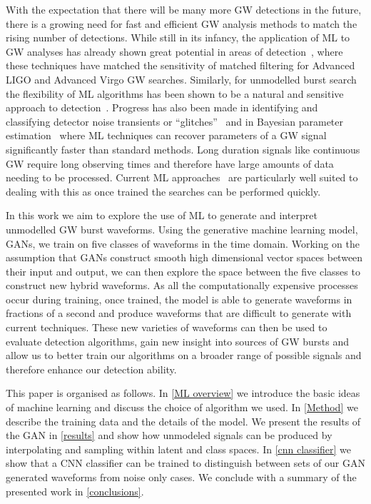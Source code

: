 \documentclass[12pt]{iopart}
\begin{document}
%
With the expectation that there will be many more GW detections in the
future, there is a growing need for fast and efficient GW analysis methods
to match the rising number of detections. While still in its infancy, the application of \ac{ML} to GW analyses has already shown great potential in areas of detection~\cite{Gabbard2017,Gebhard_2019,Krastev_2020}, where these techniques have matched the sensitivity of matched filtering for Advanced LIGO and Advanced Virgo GW searches. Similarly, for unmodelled burst search the flexibility of \ac{ML} algorithms has been shown to be a natural and sensitive approach to detection~\cite{2020arXiv200914611S}. Progress has also been made in identifying and classifying detector noise transients or  ``glitches''~\cite{Bahaadini, George_2018,Razzano_2018, 2020arXiv200801262G} and in Bayesian parameter estimation~\cite{gabbard2019bayesian,Chua:2019,green2020gravitationalwave} where \ac{ML} techniques can recover parameters of a GW signal significantly faster than standard methods. Long duration signals like continuous GW require long observing times and therefore have large amounts of data needing to be processed. Current \ac{ML} approaches~\cite{2020PhRvD.102b2005D, 2019PhRvD.100d4009D, 2020arXiv200708207B} are particularly well suited to dealing with this as once trained the searches can be performed quickly.

%
In this work we aim to explore the use of \ac{ML} to generate and interpret
unmodelled GW burst waveforms. Using the generative machine learning
model, \acp{GAN}, we train on five classes of waveforms in the time domain. Working on the assumption that \acp{GAN} construct smooth
 high dimensional vector spaces between their input and output, we can then
explore the space between the five classes to construct new
hybrid waveforms. As all the computationally expensive
processes occur during training, once trained, the model is able to
generate waveforms in fractions of a second and produce waveforms that are difficult to generate with current
techniques. These new varieties of waveforms can then be used to evaluate
detection algorithms, gain new insight into sources of GW
bursts and  allow us to better train our algorithms on a
broader range of possible signals and therefore enhance our detection ability. 

%
This paper is organised as follows. In \cref{ML overview} we introduce the basic ideas of machine learning and discuss the choice of algorithm we used. In \cref{Method} we describe the training data and the details of the model. We present the results of the GAN in \cref{results} and show how unmodeled signals can be produced by interpolating and sampling within latent and class spaces. In \cref{cnn classifier} we show that a \ac{CNN} classifier can be trained to distinguish between sets of our \ac{GAN} generated waveforms from noise only cases. We conclude with a summary of the presented work in \cref{conclusions}.
\end{document}
